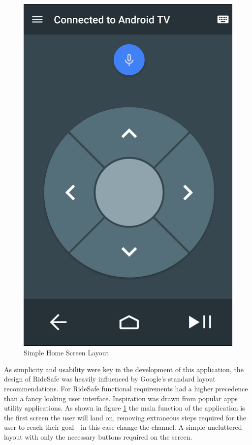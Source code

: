 \begin{figure}
\begin{center}
\includegraphics[scale = 0.4] {design/hs1.png}
\end{center}
\caption{Simple Home Screen Layout}
\label{hs1}
\end{figure}

As simplicity and usability were key in the development of this application, the design of RideSafe was heavily influenced by Google's standard layout recommendations. For RideSafe functional requirements had a higher precedence than a fancy looking user interface. Inspiration was drawn from popular apps utility applications. As shown in figure \ref{hs1}  the main function of the application is the first screen the user will land on, removing extraneous steps required for the user to reach their goal - in this case change the channel. A simple uncluttered layout with only the necessary buttons required on the screen. 


